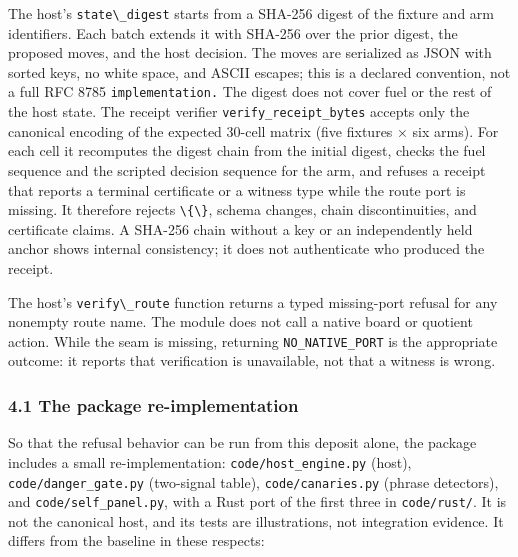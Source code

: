 \documentclass[
  11pt,
]{article}
\newcommand{\passthrough}[1]{#1}
\begin{document}
The host's \passthrough{\lstinline!state\_digest!} starts from a SHA-256
digest of the fixture and arm identifiers. Each batch extends it with
SHA-256 over the prior digest, the proposed moves, and the host
decision. The moves are serialized as JSON with sorted keys, no white
space, and ASCII escapes; this is a declared convention, not a full RFC
8785 \nolinkurl{implementation.} The digest does not cover fuel or the
rest of the host state. The receipt verifier
\nolinkurl{verify_receipt_bytes} accepts only the canonical encoding of
the expected 30-cell matrix (five fixtures × six arms). For each cell it
recomputes the digest chain from the initial digest, checks the fuel
sequence and the scripted decision sequence for the arm, and refuses a
receipt that reports a terminal certificate or a witness type while the
route port is missing. It therefore rejects
\passthrough{\lstinline!\{\}!}, schema changes, chain discontinuities,
and certificate claims. A SHA-256 chain without a key or an
independently held anchor shows internal consistency; it does not
authenticate who produced the receipt.

The host's \passthrough{\lstinline!verify\_route!} function returns a
typed missing-port refusal for any nonempty route name. The module does
not call a native board or quotient action. While the seam is missing,
returning \nolinkurl{NO_NATIVE_PORT} is the appropriate outcome: it
reports that verification is unavailable, not that a witness is wrong.

\subsubsection{4.1 The package
re-implementation}\label{the-package-re-implementation}

So that the refusal behavior can be run from this deposit alone, the
package includes a small re-implementation:
\nolinkurl{code/host_engine.py} (host), \nolinkurl{code/danger_gate.py}
(two-signal table), \nolinkurl{code/canaries.py} (phrase detectors), and
\nolinkurl{code/self_panel.py}, with a Rust port of the first three in
\passthrough{\lstinline!code/rust/!}. It is not the canonical host, and
its tests are illustrations, not integration evidence. It differs from
the baseline in these respects:
\end{document}
